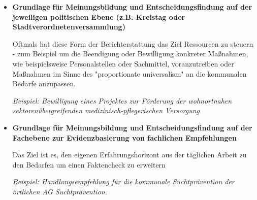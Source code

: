 \documentclass{article}
\begin{document}
\begin{itemize}
\item \textbf{G}\textbf{rundlage }\textbf{für  Meinungsbildung und Entscheidungsfindung auf der jeweiligen politischen Ebene (z.B. Kreistag oder Stadtverordnetenversammlung) }

Oftmals hat diese Form der Berichterstattung das Ziel Ressourcen zu steuern - zum Beispiel um die Beendigung oder Bewilligung konkreter Maßnahmen, wie beispielsweise Personalstellen oder Sachmittel, voranzutreiben oder Maßnahmen im Sinne des "proportionate universalism" an die kommunalen Bedarfe anzupassen.

\emph{Beispiel: Bewilligung eines Projektes zur Förderung der wohnortnahen sektorenübergreifenden medizinisch-pflegerischen Versorgung}


\end{itemize}
\begin{itemize}
\item \textbf{Grundlage für Meinungsbildung und Entscheidungsfindung auf der Fachebene zur Evidenzbasierung von fachlichen Empfehlungen}



Das Ziel ist es, den eigenen Erfahrungshorizont aus der täglichen Arbeit zu den Bedarfen  um einen Faktencheck zu erweitern

\emph{Beispiel: Handlungsempfehlung für die kommunale Suchtprävention der örtlichen AG Suchtprävention.}


\end{itemize}
\end{document}
